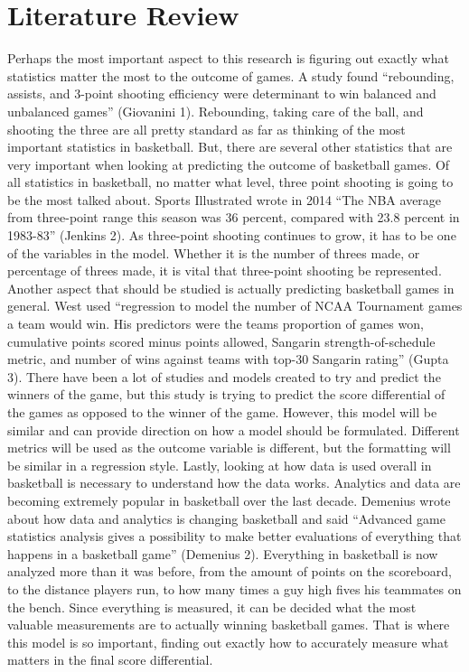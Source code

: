\documentclass{article}
\begin{document}
\section{Literature Review}
Perhaps the most important aspect to this research is figuring out exactly what statistics matter the most to the outcome of games. A study found “rebounding, assists, and 3-point shooting efficiency were determinant to win balanced and unbalanced games” (Giovanini 1). Rebounding, taking care of the ball, and shooting the three are all pretty standard as far as thinking of the most important statistics in basketball. But, there are several other statistics that are very important when looking at predicting the outcome of basketball games. Of all statistics in basketball, no matter what level, three point shooting is going to be the most talked about. Sports Illustrated wrote in 2014 “The NBA average from three-point range this season was 36 percent, compared with 23.8 percent in 1983-83” (Jenkins 2). As three-point shooting continues to grow, it has to be one of the variables in the model. Whether it is the number of threes made, or percentage of threes made, it is vital that three-point shooting be represented. 
\newline \indent Another aspect that should be studied is actually predicting basketball games in general. West used “regression to model the number of NCAA Tournament games a team would win. His predictors were the teams proportion of games won, cumulative points scored minus points allowed, Sangarin strength-of-schedule metric, and number of wins against teams with top-30 Sangarin rating” (Gupta 3). There have been a lot of studies and models created to try and predict the winners of the game, but this study is trying to predict the score differential of the games as opposed to the winner of the game. However, this model will be similar and can provide direction on how a model should be formulated. Different metrics will be used as the outcome variable is different, but the formatting will be similar in a regression style. 
\newline \indent Lastly, looking at how data is used overall in basketball is necessary to understand how the data works. Analytics and data are becoming extremely popular in basketball over the last decade. Demenius wrote about how data and analytics is changing basketball and said “Advanced game statistics analysis gives a possibility to make better evaluations of everything that happens in a basketball game” (Demenius 2). Everything in basketball is now analyzed more than it was before, from the amount of points on the scoreboard, to the distance players run, to how many times a guy high fives his teammates on the bench. Since everything is measured, it can be decided what the most valuable measurements are to actually winning basketball games. That is where this model is so important, finding out exactly how to accurately measure what matters in the final score differential. 
\end{document}
